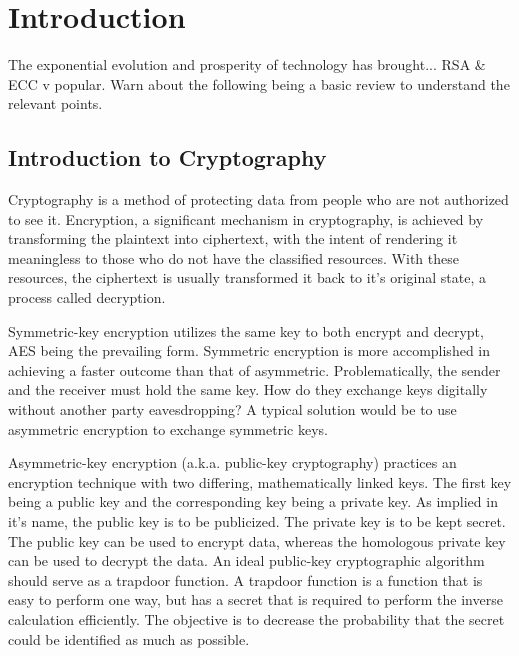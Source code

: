 \section{Introduction}
The exponential evolution and prosperity of technology has brought... RSA \& ECC v popular. Warn about the following being a basic review to understand the relevant points.

\subsection{Introduction to Cryptography}
Cryptography is a method of protecting data from people who are not authorized to see it. Encryption, a significant mechanism in cryptography, is achieved by transforming the plaintext into ciphertext, with the intent of rendering it meaningless to those who do not have the classified resources. With these resources, the ciphertext is usually transformed it back to it's original state, a process called decryption.

Symmetric-key encryption utilizes the same key to both encrypt and decrypt, AES being the prevailing form. Symmetric encryption is more accomplished in achieving a faster outcome than that of asymmetric. Problematically, the sender and the receiver must hold the same key. How do they exchange keys digitally without another party eavesdropping? A typical solution would be to use asymmetric encryption to exchange symmetric keys.

Asymmetric-key encryption (a.k.a. public-key cryptography) practices an encryption technique with two differing, mathematically linked keys. The first key being a public key and the corresponding key being a private key. As implied in it's name, the public key is to be publicized. The private key is to be kept secret. The public key can be used to encrypt data, whereas the homologous private key can be used to decrypt the data. An ideal public-key cryptographic algorithm should serve as a trapdoor function. A trapdoor function is a function that is easy to perform one way, but has a secret that is required to perform the inverse calculation efficiently. The objective is to decrease the probability that the secret could be identified as much as possible.

